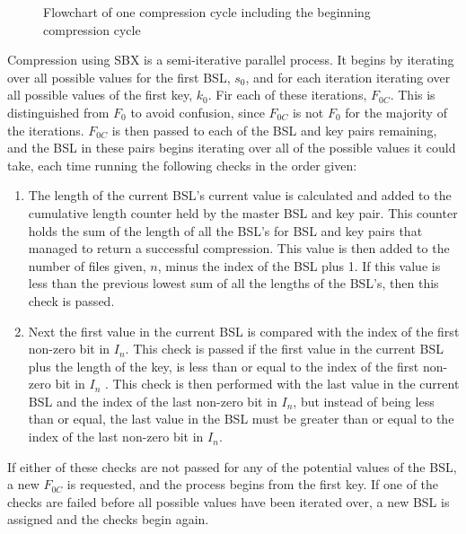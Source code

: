 \documentclass[10pt]{article}
\begin{document}
\begin{figure}[h!]
{
    }
    \caption{Flowchart of one compression cycle including the beginning compression cycle}
    \label{fig:CompressionFlowchart}
\end{figure}

Compression using SBX is a semi-iterative parallel process. It begins by iterating over all possible values for the first BSL, $s_0$, and for each iteration iterating over all possible values of the first key, $k_0$. Fir each of these iterations, $F_{0C}$. This is distinguished from $F_0$ to avoid confusion, since $F_{0C}$ is not $F_0$ for the majority of the iterations. $F_{0C}$ is then passed to each of the BSL and key pairs remaining, and the BSL in these pairs begins iterating over all of the possible values it could take, each time running the following checks in the order given:
\begin{enumerate}
    \item The length of the current BSL's current value is calculated and added to the cumulative length counter held by the master BSL and key pair. This counter holds the sum of the length of all the BSL's for BSL and key pairs that managed to return a successful compression. This value is then added to the number of files given, $n$, minus the index of the BSL plus 1. If this value is less than the previous lowest sum of all the lengths of the BSL's, then this check is passed.
    \item Next the first value in the current BSL is compared with the index of the first non-zero bit in $I_n$. This check is passed if the first value in the current BSL plus the length of the key, is less than or equal to the index of the first non-zero bit in $I_n$ . This check is then performed with the last value in the current BSL and the index of the last non-zero bit in $I_n$, but instead of being less than or equal, the last value in the BSL must be greater than or equal to the index of the last non-zero bit in $I_n$.
\end{enumerate}

If either of these checks are not passed for any of the potential values of the BSL, a new $F_{0C}$ is requested, and the process begins from the first key. If one of the checks are failed before all possible values have been iterated over, a new BSL is assigned and the checks begin again.
\end{document}
